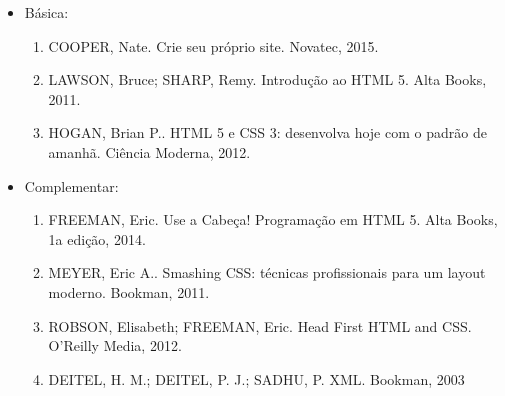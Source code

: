 \begin{itemize} 

\item Básica:
    \begin{enumerate}

    \item COOPER, Nate.
          Crie seu próprio site.
          Novatec, 2015.
    
    \item LAWSON, Bruce; SHARP, Remy.
          Introdução ao HTML 5.
          Alta Books, 2011.
    
    \item HOGAN, Brian P..
          HTML 5 e CSS 3: desenvolva hoje com o padrão de amanhã.
          Ciência Moderna, 2012.
	
    \end{enumerate}

\item Complementar:
	\begin{enumerate} 

    \item FREEMAN, Eric.
          Use a Cabeça! Programação em HTML 5.
          Alta Books, 1a edição, 2014.

    \item MEYER, Eric A..
          Smashing CSS: técnicas profissionais para um layout moderno.
          Bookman, 2011.

    \item ROBSON, Elisabeth; FREEMAN, Eric.
          Head First HTML and CSS.
          O'Reilly Media, 2012.

    \item DEITEL, H. M.; DEITEL, P. J.; SADHU, P.
          XML.
          Bookman, 2003
	
	\end{enumerate}

\end{itemize}
